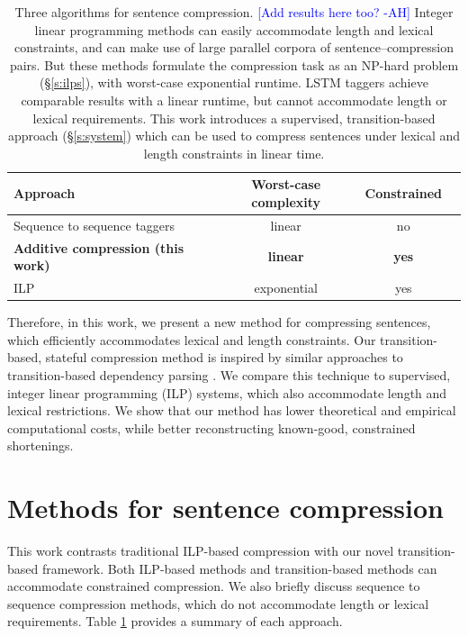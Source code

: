 \documentclass[11pt,a4paper]{article}
\newcommand{\ahcomment}[1]{\textcolor{blue}{[#1 -AH]}}
\begin{document}
\begin{table}[htb!]
\begin{tabular}{lccc}
\textbf{Approach} & \textbf{Worst-case complexity} & \textbf{Constrained}  \\ \hline
Sequence to sequence taggers \cite{filippova2015sentence}   & linear              & no         \\   
\textbf{Additive compression (this work)}  & \textbf{linear}     &      \textbf{yes}   \\
ILP    \cite{filippova2013overcoming,Wang2017CanSH}       &   exponential    & yes      \\
\end{tabular}
\caption{Three algorithms for sentence compression. \ahcomment{Add results here too?} Integer linear programming methods \cite{clarke2008global,filippova2013overcoming,Wang2017CanSH} can easily accommodate length and lexical constraints, and can make use of large parallel corpora of sentence--compression pairs. But these methods formulate the compression task as an NP-hard problem (\S\ref{s:ilps}), with worst-case exponential runtime. LSTM taggers \cite{filippova2015sentence} achieve comparable results with a linear runtime, but cannot accommodate length or lexical requirements. This work introduces a supervised, transition-based approach (\S\ref{s:system}) which can be used to compress sentences under lexical and length constraints in linear time.} 
\label{t:algos}
\end{table}


Therefore, in this work, we present a new method for compressing sentences, which efficiently accommodates lexical and length constraints. Our transition-based, stateful compression method is inspired by similar approaches to transition-based dependency parsing \cite{nivre2003,D14-1082}. We compare this technique to supervised, integer linear programming (ILP) systems, which also accommodate length and lexical restrictions. We show that our method has lower theoretical and empirical computational costs, while better reconstructing known-good, constrained shortenings. 

\section{Methods for sentence compression}

This work contrasts traditional ILP-based compression with our novel transition-based framework. Both ILP-based methods and transition-based methods can accommodate constrained compression. We also briefly discuss sequence to sequence compression methods, which do not accommodate length or lexical requirements. Table \ref{t:algos} provides a summary of each approach.
\end{document}
